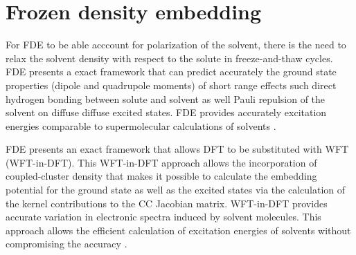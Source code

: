 \documentclass[a4paper,11pt]{report}
\begin{document}
\chapter{Frozen density embedding}
For FDE to be able acccount for polarization of the solvent, there is the need to relax the solvent density with respect to the solute
in freeze-and-thaw cycles. FDE presents a exact framework that can predict accurately the ground state properties (dipole and
quadrupole moments) of short range effects
such direct hydrogen bonding between solute and solvent as well Pauli repulsion of the solvent  on diffuse diffuse excited states.
FDE provides accurately excitation energies comparable to supermolecular calculations of solvents \citep{jacob2006comparison}.

FDE presents an exact framework that allows DFT to be substituted with WFT (WFT-in-DFT). This WFT-in-DFT approach allows the incorporation 
of coupled-cluster density that makes it possible to calculate the embedding potential for the ground state as well as the excited states via the
calculation of the kernel contributions to the CC Jacobian matrix. WFT-in-DFT provides accurate variation in electronic spectra induced by solvent
molecules. This approach allows the efficient calculation of excitation energies of solvents without compromising the accuracy \citep{hofener2013solvatochromic}.







\end{document}
